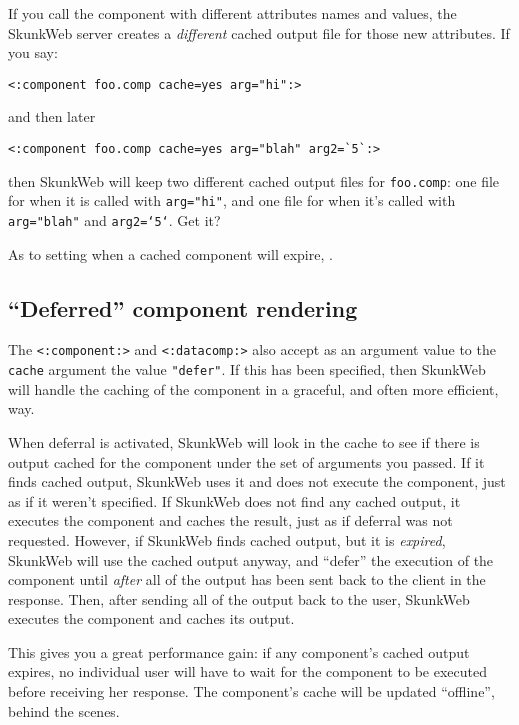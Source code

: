 \documentclass{manual}
\begin{document}
If you call the component with different attributes names and values,
the SkunkWeb server creates a \emph{different} cached output file for
those new attributes. If you say:

\begin{verbatim}<:component foo.comp cache=yes arg="hi":>
\end{verbatim}

and then later

\begin{verbatim}<:component foo.comp cache=yes arg="blah" arg2=`5`:>
\end{verbatim}

then SkunkWeb will keep two different cached output files 
for \texttt{foo.comp}: one file for when it
is called with \texttt{arg="hi"}, and one file for when 
it's called with \texttt{arg="blah"} and \texttt{arg2=`5`}. Get it?

As to setting when a cached component will expire, .

\subsection{``Deferred'' component rendering}

The \texttt{<:component:>} and \texttt{<:datacomp:>} also accept as an
argument value to the \texttt{cache} argument the value
\texttt{"defer"}.  If this has been specified, then SkunkWeb will
handle the caching of the component in a graceful, and often more
efficient, way.

When deferral is activated, SkunkWeb will look in the cache to see if
there is output cached for the component under the set of arguments
you passed. If it finds cached output, SkunkWeb uses it and does not
execute the component, just as if it weren't specified.  If SkunkWeb
does not find any cached output, it executes the component and caches
the result, just as if deferral was not requested. However, if
SkunkWeb finds cached output, but it is \emph{expired}, SkunkWeb will
use the cached output anyway, and ``defer'' the execution of the
component until \emph{after} all of the output has been sent back to
the client in the response.  Then, after sending all of the output
back to the user, SkunkWeb executes the component and caches its
output.

This gives you a great performance gain: if any component's cached
output expires, no individual user will have to wait for the component
to be executed before receiving her response. The component's cache
will be updated ``offline'', behind the scenes.
\end{document}
